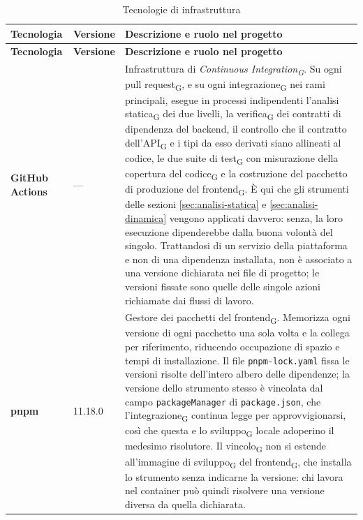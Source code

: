 \documentclass[a4paper, 10pt]{article}
\newcommand{\vPnpm}{11.18.0}
\newenvironment{tabellatec}[2]{%
  \begingroup
  \small
  \setlength{\tabcolsep}{4pt}
  \begin{longtable}{|p{2.8cm}|p{1.5cm}|p{9.2cm}|}
    \caption{#1}\label{#2}\\
    \hline
    \textbf{Tecnologia} & \textbf{Versione} & \textbf{Descrizione e ruolo nel progetto} \\
    \hline
    \endfirsthead
    \hline
    \textbf{Tecnologia} & \textbf{Versione} & \textbf{Descrizione e ruolo nel progetto} \\
    \hline
    \endhead
}{%
  \end{longtable}
  \endgroup
}
\begin{document}
\begin{tabellatec}{Tecnologie di infrastruttura}{tab:tec-infrastruttura}
    \textbf{GitHub Actions} & --- & Infrastruttura di \textit{Continuous Integration\textsubscript{G}}. Su ogni pull request\textsubscript{G}, e su ogni integrazione\textsubscript{G} nei rami principali, esegue in processi indipendenti l'analisi statica\textsubscript{G} dei due livelli, la verifica\textsubscript{G} dei contratti di dipendenza del backend, il controllo che il contratto dell'API\textsubscript{G} e i tipi da esso derivati siano allineati al codice, le due suite di test\textsubscript{G} con misurazione della copertura del codice\textsubscript{G} e la costruzione del pacchetto di produzione del frontend\textsubscript{G}. È qui che gli strumenti delle sezioni \ref{sec:analisi-statica} e \ref{sec:analisi-dinamica} vengono applicati davvero: senza, la loro esecuzione dipenderebbe dalla buona volontà del singolo. Trattandosi di un servizio della piattaforma e non di una dipendenza installata, non è associato a una versione dichiarata nei file di progetto; le versioni fissate sono quelle delle singole azioni richiamate dai flussi di lavoro. \\ \hline

    \textbf{pnpm} & \vPnpm & Gestore dei pacchetti del frontend\textsubscript{G}. Memorizza ogni versione di ogni pacchetto una sola volta e la collega per riferimento, riducendo occupazione di spazio e tempi di installazione. Il file \texttt{pnpm-lock.yaml} fissa le versioni risolte dell'intero albero delle dipendenze; la versione dello strumento stesso è vincolata dal campo \texttt{packageManager} di \texttt{package.json}, che l'integrazione\textsubscript{G} continua legge per approvvigionarsi, così che questa e lo sviluppo\textsubscript{G} locale adoperino il medesimo risolutore. Il vincolo\textsubscript{G} non si estende all'immagine di sviluppo\textsubscript{G} del frontend\textsubscript{G}, che installa lo strumento senza indicarne la versione: chi lavora nel container può quindi risolvere una versione diversa da quella dichiarata. \\ \hline


\end{tabellatec}
\end{document}

